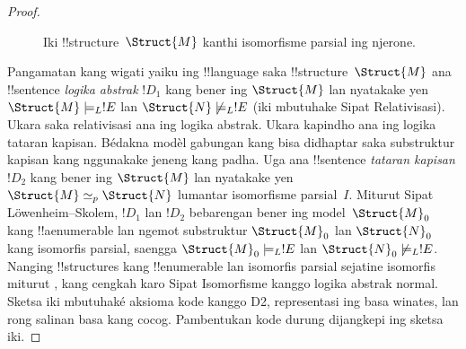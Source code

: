 \documentclass[../../../include/open-logic-section]{subfiles}
\begin{document}
\begin{proof}
\begin{figure}[h]
  \centering
  \caption{Iki !!{structure}~$\Struct{M}$ kanthi isomorfisme parsial
    ing njerone.}
\end{figure}

Pangamatan kang wigati yaiku ing !!{language} saka
!!{structure}~$\Struct{M}$ ana !!{sentence} \emph{logika abstrak}
$!D_1$ kang bener ing $\Struct{M}$ lan nyatakake yen
$\Struct{M} \models_L !E$ lan $\Struct{N} \not\models_L !E$
(iki mbutuhake Sipat Relativisasi). Ukara saka relativisasi ana ing logika abstrak. Ukara kapindho ana ing logika tataran kapisan. Bédakna modèl gabungan kang bisa didhaptar saka substruktur kapisan kang nggunakake jeneng kang padha. Uga ana !!{sentence}
\emph{tataran kapisan} $!D_2$ kang bener ing $\Struct{M}$ lan
nyatakake yen $\Struct{M} \simeq_p \Struct{N}$ lumantar
isomorfisme parsial~$I$. Miturut Sipat L\"owenheim--Skolem,
$!D_1$ lan $!D_2$ bebarengan bener ing model~$\Struct{M}_0$
kang !!a{enumerable} lan ngemot substruktur $\Struct{M}_0$
lan $\Struct{N}_0$ kang isomorfis parsial, saengga
$\Struct{M}_0 \models_L !E$ lan $\Struct{N}_0
\not\models_L !E$. Nanging !!{structure}s kang !!{enumerable}
lan isomorfis parsial sejatine isomorfis miturut
, kang cengkah karo Sipat
Isomorfisme kanggo logika abstrak normal. Sketsa iki mbutuhaké aksioma kode kanggo D2, representasi ing basa winates, lan rong salinan basa kang cocog. Pambentukan kode durung dijangkepi ing sketsa iki.
\end{proof}
\end{document}
